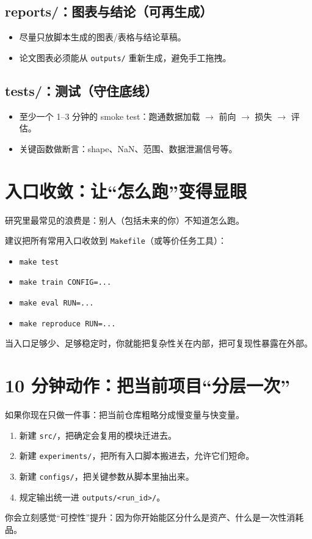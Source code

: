 \subsection{reports/：图表与结论（可再生成）}
\begin{itemize}
  \item 尽量只放脚本生成的图表/表格与结论草稿。
  \item 论文图表必须能从 \texttt{outputs/} 重新生成，避免手工拖拽。
\end{itemize}

\subsection{tests/：测试（守住底线）}
\begin{itemize}
  \item 至少一个 1--3 分钟的 smoke test：跑通数据加载 $\rightarrow$ 前向 $\rightarrow$ 损失 $\rightarrow$ 评估。
  \item 关键函数做断言：shape、NaN、范围、数据泄漏信号等。
\end{itemize}

\section{入口收敛：让“怎么跑”变得显眼}
研究里最常见的浪费是：别人（包括未来的你）不知道怎么跑。

建议把所有常用入口收敛到 \texttt{Makefile}（或等价任务工具）：
\begin{itemize}
  \item \texttt{make test}
  \item \texttt{make train CONFIG=...}
  \item \texttt{make eval RUN=...}
  \item \texttt{make reproduce RUN=...}
\end{itemize}

当入口足够少、足够稳定时，你就能把复杂性关在内部，把可复现性暴露在外部。

\section{10 分钟动作：把当前项目“分层一次”}
如果你现在只做一件事：把当前仓库粗略分成慢变量与快变量。
\begin{enumerate}
  \item 新建 \texttt{src/}，把确定会复用的模块迁进去。
  \item 新建 \texttt{experiments/}，把所有入口脚本搬进去，允许它们短命。
  \item 新建 \texttt{configs/}，把关键参数从脚本里抽出来。
  \item 规定输出统一进 \texttt{outputs/<run\_id>/}。
\end{enumerate}

你会立刻感觉“可控性”提升：因为你开始能区分什么是资产、什么是一次性消耗品。